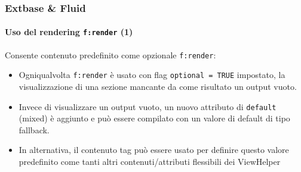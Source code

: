 \begin{frame}[fragile]
	\frametitle{Extbase \& Fluid}
	\framesubtitle{Uso del rendering \texttt{f:render} (1)}

	Consente contenuto predefinito come opzionale \texttt{f:render}:

	\begin{itemize}

		\item Ogniqualvolta \texttt{f:render} è usato con flag \texttt{optional = TRUE}
			impostato, la visualizzazione di una sezione mancante da come risultato un output vuoto.

		\item Invece di visualizzare un output vuoto, un nuovo attributo di \texttt{default}
			(mixed) è aggiunto e può essere compilato con un valore di default di tipo fallback.

		\item In alternativa, il contenuto tag può essere usato per definire questo valore predefinito
			come tanti altri contenuti/attributi flessibili dei ViewHelper

	\end{itemize}

\end{frame}


